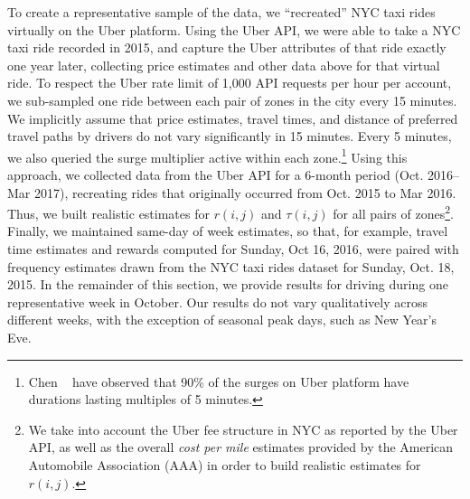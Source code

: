 To create a representative sample of the data, we ``recreated'' NYC taxi rides virtually on the Uber platform. 
Using the Uber API, we were able to take a NYC taxi ride recorded in 2015, and capture the Uber attributes of that ride exactly 
one year later, collecting price estimates and other data above for that virtual ride.
To respect the Uber rate limit of 1,000 API requests per hour per account, we sub-sampled one ride between each pair of zones in
the city every 15 minutes.
We implicitly assume that price estimates, travel times, and distance of preferred travel paths by drivers do not vary 
significantly in 15 minutes. Every 5 minutes, we also queried the surge multiplier active within each zone.\footnote{Chen {\etal}~\cite{chen2015peeking} have observed that 90\% of the surges on Uber platform 
have durations lasting multiples of 5 minutes.} 
Using this approach, we collected data from the Uber API for a 6-month period (Oct. 2016--Mar 2017), 
recreating rides that originally occurred from 
Oct. 2015 to Mar 2016.   Thus, we built realistic estimates for $r(i,j)$ and $\tau(i,j)$
for all pairs of zones\footnote{We take into account the Uber fee structure in NYC as reported by the Uber API, as well as the overall \emph{cost per mile} estimates provided by the American Automobile Association (AAA) in order to build realistic estimates for $r(i,j).$}.  Finally, we maintained same-day of week estimates, so that, for example, travel time estimates
and rewards computed for Sunday, Oct 16, 2016, were paired with frequency estimates drawn from the NYC taxi rides dataset for
Sunday, Oct. 18, 2015.
In the remainder of this section, we provide  results for driving during one representative week in October.
Our results do not vary qualitatively across different weeks, with the exception of seasonal peak days, such as New Year's Eve. 

